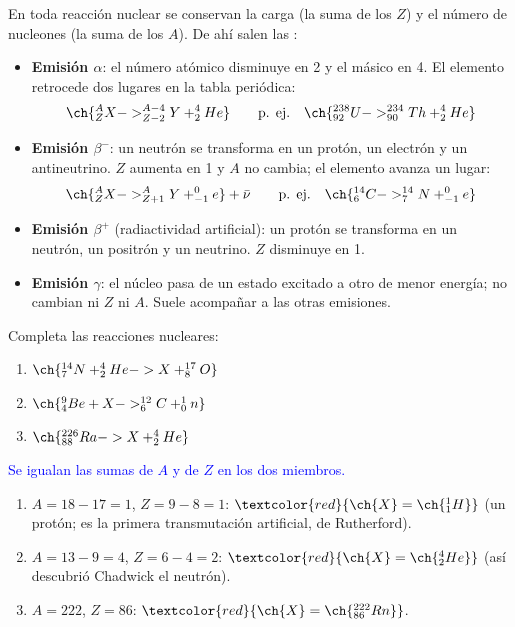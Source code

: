 En toda reacción nuclear se conservan la carga (la suma de los \(Z\)) y el número de nucleones (la suma de los \(A\)). De ahí salen las
:
\begin{itemize}
    \item \textbf{Emisión \(\alpha\)}: el número atómico disminuye en 2 y el másico en 4. El elemento retrocede dos lugares en la tabla
    periódica:
    \[ \ch{^{A}_{Z}X -> ^{A-4}_{Z-2}Y + ^{4}_{2}He} \qquad\text{p. ej.}\quad \ch{^{238}_{92}U -> ^{234}_{90}Th + ^4_2He} \]
    \item \textbf{Emisión \(\beta^-\)}: un neutrón se transforma en un protón, un electrón y un antineutrino. \(Z\) aumenta en 1 y \(A\) no
    cambia; el elemento avanza un lugar:
    \[ \ch{^{A}_{Z}X -> ^{A}_{Z+1}Y + ^{0}_{-1}e} + \bar{\nu} \qquad\text{p. ej.}\quad \ch{^{14}_6C -> ^{14}_7N + ^0_{-1}e} \]
    \item \textbf{Emisión \(\beta^+\)} (radiactividad artificial): un protón se transforma en un neutrón, un positrón y un neutrino. \(Z\)
    disminuye en 1.
    \item \textbf{Emisión \(\gamma\)}: el núcleo pasa de un estado excitado a otro de menor energía; no cambian ni \(Z\) ni \(A\).
    Suele acompañar a las otras emisiones.
\end{itemize}

\begin{exercise}
    Completa las reacciones nucleares:
    \begin{enumerate}[label=\letraminuscula]
        \item \(\ch{^{14}_7N + ^4_2He -> X + ^{17}_8O}\)
        \item \(\ch{^{9}_4Be + X -> ^{12}_6C + ^1_0n}\)
        \item \(\ch{^{226}_{88}Ra -> X + ^4_2He}\)
    \end{enumerate}
    \begin{solu}
        \textcolor{blue}{Se igualan las sumas de \(A\) y de \(Z\) en los dos miembros.}
        \begin{enumerate}[label=\letraminuscula]
            \item \(A = 18 - 17 = 1\), \(Z = 9 - 8 = 1\): \(\textcolor{red}{\ch{X} = \ch{^1_1H}}\) (un protón; es la primera transmutación artificial, de Rutherford).
            \item \(A = 13 - 9 = 4\), \(Z = 6 - 4 = 2\): \(\textcolor{red}{\ch{X} = \ch{^4_2He}}\) (así descubrió Chadwick el neutrón).
            \item \(A = 222\), \(Z = 86\): \(\textcolor{red}{\ch{X} = \ch{^{222}_{86}Rn}}\).
        \end{enumerate}
    \end{solu}
\end{exercise}

